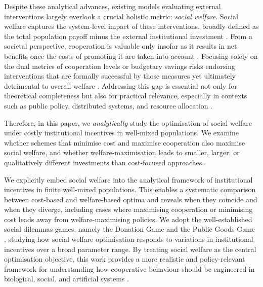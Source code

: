 \documentclass{article}
\begin{document}
Despite these analytical advances, existing models evaluating external interventions largely overlook a crucial holistic metric: \textit{social welfare}. Social welfare captures the system-level impact of these interventions, broadly defined as the total population payoff minus the external institutional investment \cite{HanInterface2024Welfare}. From a societal perspective, cooperation is valuable only insofar as it results in net benefits once the costs of promoting it are taken into account \cite{karsu2015inequity,nyman2006efficiency,kaneko1979nash,song2026emergence}. Focusing solely on the dual metrics of cooperation levels or budgetary savings risks endorsing interventions that are formally successful by those measures yet ultimately detrimental to overall welfare \cite{HAN2026_social_welfare}. Addressing this gap is essential not only for theoretical completeness but also for practical relevance, especially in contexts such as public policy, distributed systems, and resource allocation \cite{paiva2018engineering,nyman2006efficiency,HAN2026_social_welfare}.

Therefore, in this paper, we \textit{analytically} study the optimisation of social welfare under costly institutional incentives in well-mixed populations. We examine whether schemes that minimise cost and maximise cooperation also maximise social welfare, and whether welfare‑maximisation leads to smaller, larger, or qualitatively different investments than cost‑focused approaches..

We explicitly embed social welfare into the analytical framework of institutional incentives in finite well-mixed populations. This enables a systematic comparison between cost-based and welfare-based optima and reveals when they coincide and when they diverge, including cases where maximising cooperation or minimising cost leads away from welfare-maximising policies. We adopt the well-established social dilemmas games, namely the Donation Game and the Public Goods Game \cite{sigmund2010calculus}, studying how social welfare optimisation responds to variations in institutional incentives over a broad parameter range. By treating social welfare as the central optimisation objective, this work provides a more realistic and policy-relevant framework for understanding how cooperative behaviour should be engineered in biological, social, and artificial systems \cite{HAN2026_social_welfare}.
\end{document}
